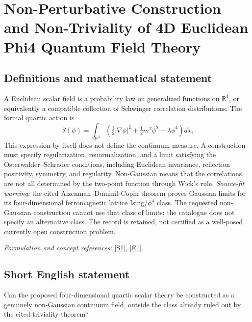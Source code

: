 \documentclass[11pt]{article}
\newcommand{\R}{\mathbb{R}}
\newcommand{\sref}[2]{\hyperlink{source:#1:#2}{[S#2]}}
\newcommand{\eref}[2]{\hyperlink{extra:#1:#2}{[E#2]}}
\newif\ifshowcatalogue
\newcommand{\cataloguescope}[1]{\ifshowcatalogue
 \paragraph{Exact scope in the supplied catalogue.}
 \begin{quote}\small #1\end{quote}\fi}
\begin{document}
\setcounter{section}{0}
\clearpage
\section*{\texorpdfstring{Non-Perturbative Construction and Non-Triviality of 4D Euclidean Phi4 Quantum Field Theory}{Non-Perturbative Construction and Non-Triviality of 4D Euclidean Phi4 Quantum Field Theory}}\label{statement}
\subsection{Definitions and mathematical statement}
A Euclidean scalar field is a probability law on generalized functions on $\R^4$, or equivalently a compatible collection of Schwinger correlation distributions. The formal quartic action is
\[
 S(\phi)=\int_{\R^4}\left(\tfrac12|\nabla\phi|^2+\tfrac12m^2\phi^2+\lambda\phi^4\right)dx.
\]
This expression by itself does not define the continuum measure. A construction must specify regularization, renormalization, and a limit satisfying the Osterwalder--Schrader conditions, including Euclidean invariance, reflection positivity, symmetry, and regularity. Non-Gaussian means that the correlations are not all determined by the two-point function through Wick's rule. \emph{Source-fit warning:} the cited Aizenman--Duminil-Copin theorem proves Gaussian limits for its four-dimensional ferromagnetic lattice Ising/$\phi^4$ class. The requested non-Gaussian construction cannot use that class of limits; the catalogue does not specify an alternative class. The record is retained, not certified as a well-posed currently open construction problem.
\par\smallskip\textit{Formulation and concept references:} \sref{statement}{1}, \eref{statement}{1}.
\cataloguescope{Construct a non-trivial, non-Gaussian Euclidean scalar quantum field theory with quartic interaction (phi\textasciicircum{}4)\_4 in four spacetime dimensions satisfying the Osterwalder-Schrader axioms.}
\subsection{Short English statement}
Can the proposed four-dimensional quartic scalar theory be constructed as a genuinely non-Gaussian continuum field, outside the class already ruled out by the cited triviality theorem?
\end{document}
